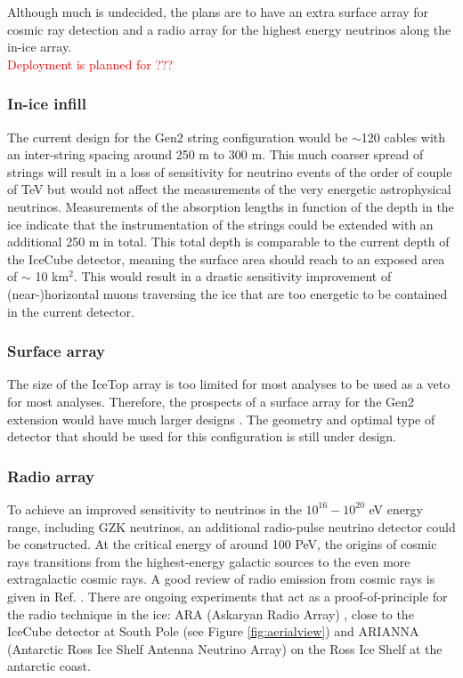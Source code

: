 Although much is undecided, the plans are to have an extra surface array for cosmic ray detection and a radio array for the highest energy neutrinos along the in-ice array.\\
\newline
\textcolor{red}{Deployment is planned for ???}

\subsubsection{In-ice infill}
The current design for the Gen2 string configuration would be $\sim$120 cables with an inter-string spacing around 250 m to 300 m. This much coarser spread of strings will result in a loss of sensitivity for neutrino events of the order of couple of TeV but would not affect the measurements of the very energetic astrophysical neutrinos. Measurements of the absorption lengths in function of the depth in the ice indicate that the instrumentation of the strings could be extended with an additional 250 m in total. This total depth is comparable to the current depth of the IceCube detector, meaning the surface area should reach to an exposed area of $\sim$ 10 km$^2$. This would result in a drastic sensitivity improvement of (near-)horizontal muons traversing the ice that are too energetic to be contained in the current detector.
\subsubsection{Surface array}
The size of the IceTop array is too limited for most analyses to be used as a veto for most analyses. Therefore, the prospects of a surface array for the Gen2 extension would have much larger designs \cite{Euler:2015oen}. The geometry and optimal type of detector that should be used for this configuration is still under design.
\subsubsection{Radio array}
\label{subsub:radio}
To achieve an improved sensitivity to neutrinos in the $10^{16} - 10^{20}$ eV energy range, including GZK neutrinos, an additional radio-pulse neutrino detector could be constructed. At the critical energy of around 100 PeV, the origins of cosmic rays transitions from the highest-energy galactic sources to the even more extragalactic cosmic rays. A good review of radio emission from cosmic rays is given in Ref. \cite{Schroder:2016hrv}. There are ongoing experiments that act as a proof-of-principle for the radio technique in the ice: ARA (Askaryan Radio Array) \cite{Allison:2015eky}, close to the IceCube detector at South Pole (see Figure \ref{fig:aerialview}) and ARIANNA (Antarctic Ross Ice Shelf Antenna Neutrino Array) \cite{Glaser:2018ifj} on the Ross Ice Shelf at the antarctic coast.



